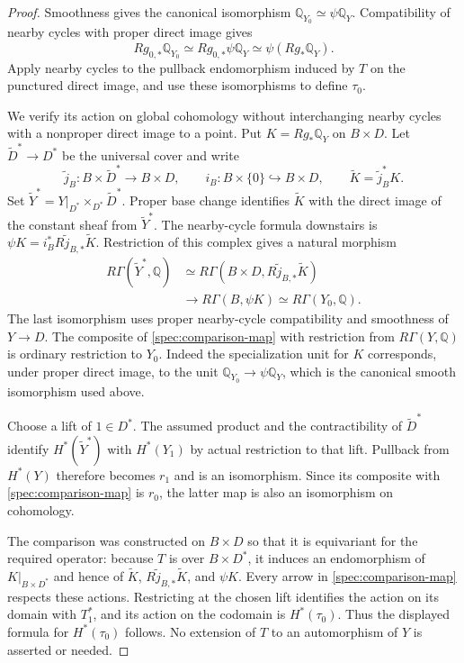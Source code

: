 \begin{proof}
Smoothness gives the canonical isomorphism
$\mathbb Q_{Y_0}\simeq\psi\mathbb Q_Y$.
Compatibility of nearby cycles with proper direct image gives
\[
 Rg_{0,*}\mathbb Q_{Y_0}
 \simeq Rg_{0,*}\psi\mathbb Q_Y
 \simeq\psi(Rg_*\mathbb Q_Y).
\]
Apply nearby cycles to the pullback endomorphism induced by $T$ on the
punctured direct image, and use these isomorphisms to define $\tau_0$.

We verify its action on global cohomology without interchanging nearby
cycles with a nonproper direct image to a point.  Put $K=Rg_*\mathbb Q_Y$
on $B\times D$.  Let $\widetilde D^*\to D^*$ be the universal cover and write
\[
 \widetilde j_B:B\times\widetilde D^*\longrightarrow B\times D,
 \qquad i_B:B\times\{0\}\hookrightarrow B\times D,
 \qquad \widetilde K=\widetilde j_B^*K.
\]
Set $\widetilde Y^*=Y|_{D^*}\times_{D^*}\widetilde D^*$.
Proper base change identifies $\widetilde K$ with the direct image of the
constant sheaf from $\widetilde Y^*$.  The nearby-cycle formula downstairs
is $\psi K=i_B^*R\widetilde j_{B,*}\widetilde K$.  Restriction of this
complex gives a natural morphism
\begin{equation}\label{spec:comparison-map}
 \begin{split}
 R\Gamma(\widetilde Y^*,\mathbb Q)
 &\simeq R\Gamma(B\times D,R\widetilde j_{B,*}\widetilde K)\\
 &\longrightarrow R\Gamma(B,\psi K)
 \simeq R\Gamma(Y_0,\mathbb Q).
 \end{split}
\end{equation}
The last isomorphism uses proper nearby-cycle compatibility and smoothness
of $Y\to D$.  The composite of \eqref{spec:comparison-map} with restriction
from $R\Gamma(Y,\mathbb Q)$ is ordinary restriction to $Y_0$.
Indeed the specialization unit for $K$ corresponds, under proper direct
image, to the unit $\mathbb Q_{Y_0}\to\psi\mathbb Q_Y$, which is the
canonical smooth isomorphism used above.

Choose a lift of $1\in D^*$.  The assumed product and the contractibility of
$\widetilde D^*$ identify $H^*(\widetilde Y^*)$ with $H^*(Y_1)$ by actual
restriction to that lift.  Pullback from $H^*(Y)$ therefore becomes $r_1$
and is an isomorphism.  Since its composite with
\eqref{spec:comparison-map} is $r_0$, the latter map is also an isomorphism
on cohomology.

The comparison was constructed on $B\times D$ so that it is equivariant
for the required operator: because $T$ is over $B\times D^*$, it induces
an endomorphism of $K|_{B\times D^*}$ and hence of
$\widetilde K$, $R\widetilde j_{B,*}\widetilde K$, and $\psi K$.
Every arrow in \eqref{spec:comparison-map} respects these actions.
Restricting at the chosen lift identifies the action on its domain with
$T_1^*$, and its action on the codomain is $H^*(\tau_0)$.
Thus the displayed formula for $H^*(\tau_0)$ follows.  No extension of $T$
to an automorphism of $Y$ is asserted or needed.
\end{proof}

